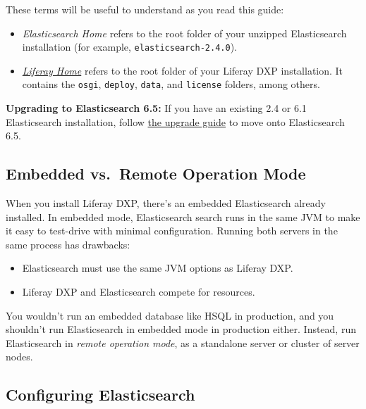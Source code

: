 These terms will be useful to understand as you read this guide:

\begin{itemize}
\item
  \emph{Elasticsearch Home} refers to the root folder of your unzipped
  Elasticsearch installation (for example,
  \texttt{elasticsearch-2.4.0}).
\item
  \href{/docs/7-0/deploy/-/knowledge_base/d/installing-product\#liferay-home}{\emph{Liferay
  Home}} refers to the root folder of your Liferay DXP installation. It
  contains the \texttt{osgi}, \texttt{deploy}, \texttt{data}, and
  \texttt{license} folders, among others.
\end{itemize}

\noindent\hrulefill

\textbf{Upgrading to Elasticsearch 6.5:} If you have an existing 2.4 or
6.1 Elasticsearch installation, follow
\href{/docs/7-0/deploy/-/knowledge_base/d/upgrading-to-elasticsearch-6}{the
upgrade guide} to move onto Elasticsearch 6.5.

\noindent\hrulefill

\subsection{Embedded vs.~Remote Operation
Mode}\label{embedded-vs.-remote-operation-mode}

When you install Liferay DXP, there's an embedded Elasticsearch already
installed. In embedded mode, Elasticsearch search runs in the same JVM
to make it easy to test-drive with minimal configuration. Running both
servers in the same process has drawbacks:

\begin{itemize}
\tightlist
\item
  Elasticsearch must use the same JVM options as Liferay DXP.
\item
  Liferay DXP and Elasticsearch compete for resources.
\end{itemize}

You wouldn't run an embedded database like HSQL in production, and you
shouldn't run Elasticsearch in embedded mode in production either.
Instead, run Elasticsearch in \emph{remote operation mode}, as a
standalone server or cluster of server nodes.

\subsection{Configuring
Elasticsearch}\label{configuring-elasticsearch-1}

